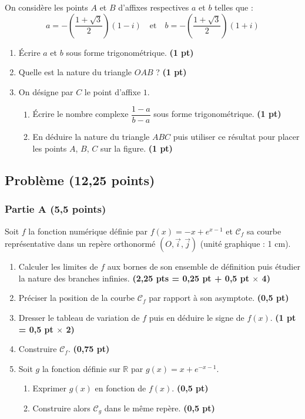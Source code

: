 \documentclass[12pt,a4paper]{article}
\begin{document}
On considère les points $A$ et $B$ d’affixes respectives $a$ et $b$ telles que :
\[
a = -\left(\frac{1+\sqrt{3}}{2}\right)(1-i) \quad \text{et} \quad b = -\left(\frac{1+\sqrt{3}}{2}\right)(1+i)
\]
\begin{enumerate}
  \item Écrire $a$ et $b$ sous forme trigonométrique. \textbf{(1 pt)}
  \item Quelle est la nature du triangle $OAB$ ? \textbf{(1 pt)}
  \item On désigne par $C$ le point d’affixe $1$.
  \begin{enumerate}
    \item Écrire le nombre complexe $\dfrac{1-a}{b-a}$ sous forme trigonométrique. \textbf{(1 pt)}
    \item En déduire la nature du triangle $ABC$ puis utiliser ce résultat pour placer les points $A$, $B$, $C$ sur la figure. \textbf{(1 pt)}
  \end{enumerate}
\end{enumerate}

\subsection*{Problème \mdseries(12,25 points)}

\subsubsection*{Partie A \mdseries(5,5 points)}
Soit $f$ la fonction numérique définie par $f(x) = -x + e^{x-1}$ et $\mathcal{C}_{f}$ sa courbe représentative dans un repère orthonormé $(O, \vec{i}, \vec{j})$ (unité graphique : 1 cm).

\begin{enumerate}
  \item Calculer les limites de $f$ aux bornes de son ensemble de définition puis étudier la nature des branches infinies. \textbf{(2,25 pts = 0,25 pt + 0,5 pt $\times$ 4)}
  \item Préciser la position de la courbe $\mathcal{C}_{f}$ par rapport à son asymptote. \textbf{(0,5 pt)}
  \item Dresser le tableau de variation de $f$ puis en déduire le signe de $f(x)$. \textbf{(1 pt = 0,5 pt $\times$ 2)}
  \item Construire $\mathcal{C}_{f}$. \textbf{(0,75 pt)}
  \item Soit $g$ la fonction définie sur $\mathbb{R}$ par $g(x) = x + e^{-x-1}$.
  \begin{enumerate}
    \item Exprimer $g(x)$ en fonction de $f(x)$. \textbf{(0,5 pt)}
    \item Construire alors $\mathcal{C}_{g}$ dans le même repère. \textbf{(0,5 pt)}
  \end{enumerate}
\end{enumerate}
\end{document}
